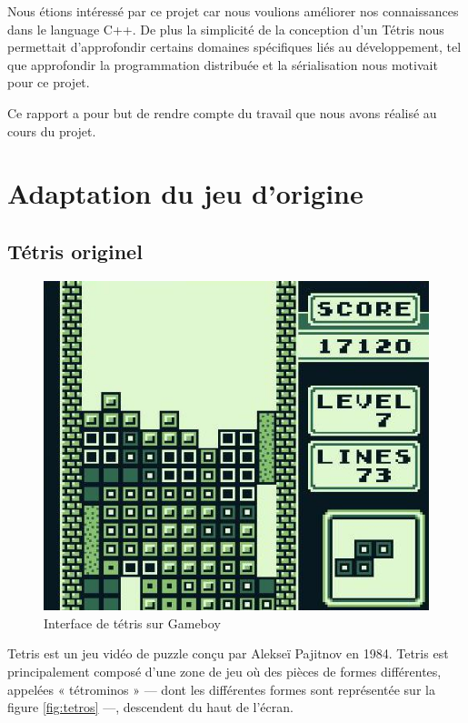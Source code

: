\documentclass[a4paper, 12pt]{article}
\begin{document}
	\bigskip
	Nous étions intéressé par ce projet car nous voulions améliorer nos connaissances dans le language C++. De plus la simplicité de la conception d'un Tétris nous permettait d'approfondir certains domaines spécifiques liés au développement, tel que approfondir la programmation distribuée et la sérialisation nous motivait pour ce projet.

	\bigskip
	Ce rapport a pour but de rendre compte du travail que nous avons réalisé au cours du projet.

	\newpage

\section{Adaptation du jeu d'origine}
	\subsection{Tétris originel}		

		\begin{figure}[b]
			\centering
			\includegraphics[scale=0.3]{img/Tetris8.jpg}
			\caption{Interface de tétris sur Gameboy}
			\label{fig:tetris}
		\end{figure}
		
		Tetris est un jeu vidéo de puzzle conçu par Alekseï Pajitnov en 1984. Tetris est principalement composé d'une zone de jeu où des pièces de formes différentes, appelées « tétrominos » --- dont les différentes formes sont représentée sur la figure \ref{fig:tetros} ---, descendent du haut de l'écran. 
		
\end{document}
